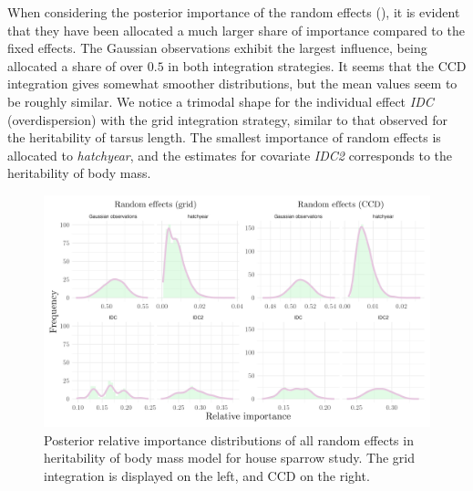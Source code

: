 When considering the posterior importance of the random effects (), it is evident that they have been allocated a much larger share of importance compared to the fixed effects. The Gaussian observations exhibit the largest influence, being allocated a share of over $0.5$ in both integration strategies. It seems that the CCD integration gives somewhat smoother distributions, but the mean values seem to be roughly similar. We notice a trimodal shape for the individual effect \textit{IDC} (overdispersion) with the grid integration strategy, similar to that observed for the heritability of tarsus length. The smallest importance of random effects is allocated to \textit{hatchyear}, and the estimates for covariate \textit{IDC2} corresponds to the heritability of body mass.
\begin{figure}[H]%
  \centering
  \includegraphics[width=1\linewidth]{Figures/House sparrow study/Mass_random.png}
  \caption[Posterior relative importance distributions of all random effects in body mass model for house sparrow study]{Posterior relative importance distributions of all random effects in heritability of body mass model for house sparrow study. The grid integration is displayed on the left, and CCD on the right.}
  \label{fig:mass_random_sparrows}
\end{figure}

